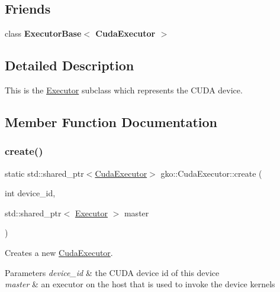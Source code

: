 \subsection*{Friends}
\begin{DoxyCompactItemize}
\item 
\mbox{\label{classgko_1_1CudaExecutor_ae0513f5102241a436433d40afb0e84f3}} 
class {\bfseries Executor\+Base$<$ Cuda\+Executor $>$}
\end{DoxyCompactItemize}


\subsection{Detailed Description}
This is the \hyperlink{classgko_1_1Executor}{Executor} subclass which represents the C\+U\+DA device. 

\subsection{Member Function Documentation}
\mbox{\label{classgko_1_1CudaExecutor_a2718a92034350650ef406ffdb60db090}} 
\subsubsection{\texorpdfstring{create()}{create()}}
{\footnotesize\ttfamily static std\+::shared\+\_\+ptr$<$\hyperlink{classgko_1_1CudaExecutor}{Cuda\+Executor}$>$ gko\+::\+Cuda\+Executor\+::create (\begin{DoxyParamCaption}\item[{int}]{device\+\_\+id,  }\item[{std\+::shared\+\_\+ptr$<$ \hyperlink{classgko_1_1Executor}{Executor} $>$}]{master }\end{DoxyParamCaption})\hspace{0.3cm}{\ttfamily [static]}}



Creates a new \hyperlink{classgko_1_1CudaExecutor}{Cuda\+Executor}. 


\begin{DoxyParams}{Parameters}
{\em device\+\_\+id} & the C\+U\+DA device id of this device \\
\hline
{\em master} & an executor on the host that is used to invoke the device kernels \\
\hline
\end{DoxyParams}
\mbox{\label{classgko_1_1CudaExecutor_a5b5f8febb914c9984bc77b15e7bb7601}} 
